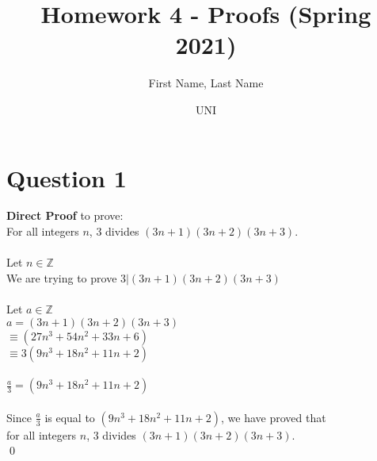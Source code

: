 \documentclass{article}
\title{Homework 4 - Proofs (Spring 2021)}
\author
{
First Name, Last Name
\and UNI
}
\begin{document}
    \maketitle
    
    \section*{Question 1}
    \textbf{Direct Proof} to prove: \\
    \indent For all integers $n$, $3$ divides $(3n + 1)(3n + 2)(3n + 3)$. \\ \\ 
    Let $n \in \mathbb{Z}$ \\
    We are trying to prove $3 | (3n + 1)(3n + 2)(3n + 3)$ \\ \\
    Let $a \in \mathbb{Z}$ \\
    $a = (3n + 1)(3n + 2)(3n + 3)$ \\
    $\equiv (27n^3 + 54n^2 + 33n + 6)$ \\
    $\equiv 3(9n^3 + 18n^2 + 11n + 2)$ \\ \\
    $\frac{a}{3} = (9n^3 + 18n^2 + 11n + 2)$ \\ \\
    Since $\frac{a}{3}$ is equal to $(9n^3 + 18n^2 + 11n + 2)$, we have proved that \\ for all integers $n$, $3$ divides $(3n + 1)(3n + 2)(3n + 3)$. \\ \qed

    \newpage
\end{document}
